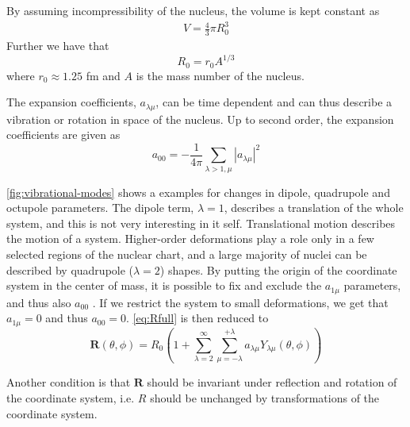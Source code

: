 \documentclass[twoside,english]{uiofysmaster/uiofysmaster}
\let\orgautoref\autoref
\renewcommand{\autoref}
        {%
		 \def\sectionautorefname{Section}%
		 \def\subsectionautorefname{Section}%
		 \def\subsubsectionautorefname{Section}%
		 \def\chapterautorefname{Chapter}%
          \orgautoref}
\begin{document}
By assuming incompressibility of the nucleus, the volume is kept constant as
\begin{align*}
	V = \frac{4}{3} \pi R_0^3
\end{align*}
Further we have that
\begin{equation}\label{eq:radius}
	R_0 = r_0 A^{1/3}
\end{equation}
where $r_0 \approx 1.25$ fm and $A$ is the mass number of the nucleus.

The expansion coefficients, $a_{\lambda \mu}$, can be time dependent and can thus describe a vibration or rotation in space of the nucleus. 
Up to second order, the expansion coefficients are given as
\begin{equation}
	a_{00} = -\frac{1}{4\pi} \sum_{\lambda > 1, \mu} | a_{\lambda\mu} |^2
\end{equation}

\autoref{fig:vibrational-modes} shows a examples for changes in dipole, quadrupole and octupole parameters.
The dipole term, $\lambda = 1$, describes a translation of the whole system, and this is not very interesting in it self. 
Translational motion describes the motion of a system. 
Higher-order deformations play a role only in a few selected regions of the nuclear chart, and a large majority of nuclei can be described by quadrupole ($\lambda = 2$) shapes.
By putting the origin of the coordinate system in the center of mass, it is possible to fix and exclude the $a_{1\mu}$ parameters, and thus also $a_{00}$ \cite{RS}. 
If we restrict the system to small deformations, we get that $a_{1\mu} = 0$ and thus $a_{00} = 0$.
\autoref{eq:Rfull} is then reduced to
\begin{equation}\label{eq:Rmid}
	\mathbf{R}(\theta, \phi) = R_0 \left( 1 +  \sum^\infty_{\lambda = 2} \sum^{+\lambda}_{\mu = -\lambda} a_{\lambda \mu} Y_{\lambda \mu}(\theta, \phi) \right)
\end{equation}

Another condition is that $\mathbf{R}$ should be invariant under reflection and rotation of the coordinate system, i.e. $R$ should be unchanged by transformations of the coordinate system.
\end{document}
